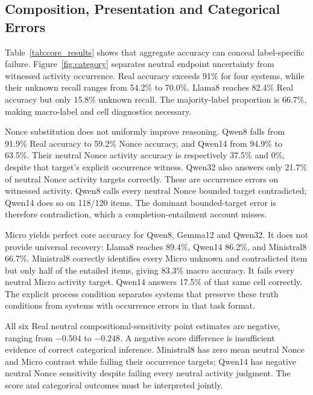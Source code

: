 \documentclass[sigconf,anonymous,review]{acmart}
\begin{document}
\subsection{Composition, Presentation and Categorical Errors}

Table~\ref{tab:core_results} shows that aggregate accuracy can conceal label-specific failure. Figure~\ref{fig:category} separates neutral endpoint uncertainty from witnessed activity occurrence. Real accuracy exceeds 91\% for four systems, while their unknown recall ranges from 54.2\% to 70.0\%. Llama8 reaches 82.4\% Real accuracy but only 15.8\% unknown recall. The majority-label proportion is 66.7\%, making macro-label and cell diagnostics necessary.

Nonce substitution does not uniformly improve reasoning. Qwen8 falls from 91.9\% Real accuracy to 59.2\% Nonce accuracy, and Qwen14 from 94.9\% to 63.5\%. Their neutral Nonce activity accuracy is respectively 37.5\% and 0\%, despite that target's explicit occurrence witness. Qwen32 also answers only 21.7\% of neutral Nonce activity targets correctly. These are occurrence errors on witnessed activity. Qwen8 calls every neutral Nonce bounded target contradicted; Qwen14 does so on 118/120 items. The dominant bounded-target error is therefore contradiction, which a completion-entailment account misses.

Micro yields perfect core accuracy for Qwen8, Gemma12 and Qwen32. It does not provide universal recovery: Llama8 reaches 89.4\%, Qwen14 86.2\%, and Ministral8 66.7\%. Ministral8 correctly identifies every Micro unknown and contradicted item but only half of the entailed items, giving 83.3\% macro accuracy. It fails every neutral Micro activity target. Qwen14 answers 17.5\% of that same cell correctly. The explicit process condition separates systems that preserve these truth conditions from systems with occurrence errors in that task format.

All six Real neutral compositional-sensitivity point estimates are negative, ranging from $-0.504$ to $-0.248$. A negative score difference is insufficient evidence of correct categorical inference. Ministral8 has zero mean neutral Nonce and Micro contrast while failing their occurrence targets; Qwen14 has negative neutral Nonce sensitivity despite failing every neutral activity judgment. The score and categorical outcomes must be interpreted jointly.
\end{document}
